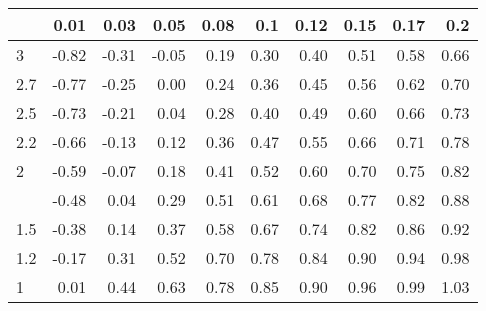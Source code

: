
\begin{tabular}{lrrrrrrrrr}
\toprule
  & 0.01 & 0.03 & 0.05 & 0.08 & 0.1 & 0.12 & 0.15 & 0.17 & 0.2\\
\midrule
3 & -0.82 & -0.31 & -0.05 & 0.19 & 0.30 & 0.40 & 0.51 & 0.58 & 0.66\\
2.7 & -0.77 & -0.25 & 0.00 & 0.24 & 0.36 & 0.45 & 0.56 & 0.62 & 0.70\\
2.5 & -0.73 & -0.21 & 0.04 & 0.28 & 0.40 & 0.49 & 0.60 & 0.66 & 0.73\\
2.2 & -0.66 & -0.13 & 0.12 & 0.36 & 0.47 & 0.55 & 0.66 & 0.71 & 0.78\\
2 & -0.59 & -0.07 & 0.18 & 0.41 & 0.52 & 0.60 & 0.70 & 0.75 & 0.82\\
\addlinespace
1.7 & -0.48 & 0.04 & 0.29 & 0.51 & 0.61 & 0.68 & 0.77 & 0.82 & 0.88\\
1.5 & -0.38 & 0.14 & 0.37 & 0.58 & 0.67 & 0.74 & 0.82 & 0.86 & 0.92\\
1.2 & -0.17 & 0.31 & 0.52 & 0.70 & 0.78 & 0.84 & 0.90 & 0.94 & 0.98\\
1 & 0.01 & 0.44 & 0.63 & 0.78 & 0.85 & 0.90 & 0.96 & 0.99 & 1.03\\
\bottomrule
\end{tabular}
